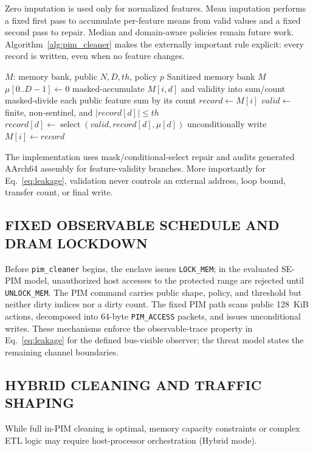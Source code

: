 \documentclass[conference]{IEEEtran}
\begin{document}
Zero imputation is used only for normalized features. Mean imputation performs a fixed first pass to accumulate per-feature means from valid values and a fixed second pass to repair. Median and domain-aware policies remain future work. Algorithm~\ref{alg:pim_cleaner} makes the externally important rule explicit: every record is written, even when no feature changes.

\begin{algorithm}[H]
\caption{PIM-Cleanser fixed-schedule sanitization kernel}
\begin{algorithmic}[1]
\REQUIRE $M$: memory bank, public $N,D,th$, policy $p$
\ENSURE Sanitized memory bank $M$
\STATE $\mu[0..D-1]\gets 0$
      \STATE masked-accumulate $M[i,d]$ and validity into sum/count
    \ENDFOR
  \ENDFOR
  \STATE masked-divide each public feature sum by its count
\ENDIF
{}
    \STATE $record \gets M[i]$
      \STATE $valid\gets$ finite, non-sentinel, and $|record[d]|\le th$
      \STATE $record[d]\gets\operatorname{select}(valid,record[d],\mu[d])$
    \ENDFOR
    \STATE unconditionally write $M[i]\gets record$
\ENDFOR
\end{algorithmic}
\label{alg:pim_cleaner}
\end{algorithm}

The implementation uses mask/conditional-select repair and audits generated
AArch64 assembly for feature-validity branches. More importantly for
Eq.~\eqref{eq:leakage}, validation never controls an external address, loop
bound, transfer count, or final write.

\subsection{FIXED OBSERVABLE SCHEDULE AND DRAM LOCKDOWN}
Before \texttt{pim\_cleaner} begins, the enclave issues \texttt{LOCK\_MEM}; in
the evaluated SE-PIM model, unauthorized host accesses to the protected range
are rejected until \texttt{UNLOCK\_MEM}. The PIM command carries public shape,
policy, and threshold but neither dirty indices nor a dirty count. The fixed
PIM path scans public 128~KiB actions, decomposed into 64-byte
\texttt{PIM\_ACCESS} packets, and issues unconditional writes. These mechanisms
enforce the observable-trace property in Eq.~\eqref{eq:leakage} for the defined
bus-visible observer; the threat model states the remaining channel boundaries.

\subsection{HYBRID CLEANING AND TRAFFIC SHAPING}
While full in-PIM cleaning is optimal, memory capacity constraints or complex ETL logic may require host-processor orchestration (Hybrid mode).
\end{document}
